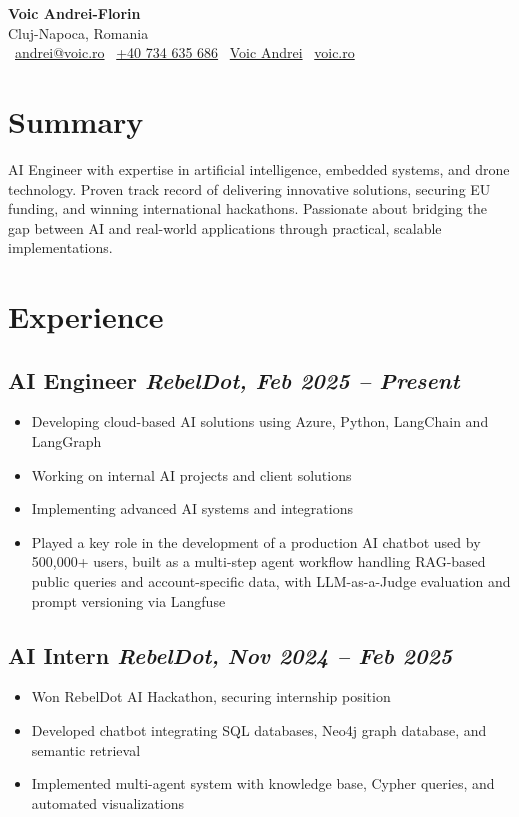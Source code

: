 \documentclass[11pt,a4paper]{article}
\begin{document}
\begin{center}
    {\LARGE \textbf{Voic Andrei-Florin}} \\[0.3em]
    Cluj-Napoca, Romania \\
    \faEnvelope~\href{mailto:andrei@voic.ro}{andrei@voic.ro} \quad
    \faPhone~\href{tel:+40734635686}{+40 734 635 686} \quad
    \faLinkedin~\href{https://linkedin.com/in/voic-andrei-622781212}{Voic Andrei} \quad
    \faGlobe~\href{https://voic.ro}{voic.ro}
\end{center}

\section*{Summary}
AI Engineer with expertise in artificial intelligence, embedded systems, and drone technology. Proven track record of delivering innovative solutions, securing EU funding, and winning international hackathons. Passionate about bridging the gap between AI and real-world applications through practical, scalable implementations.

\section*{Experience}

\subsection*{AI Engineer \hfill \textit{RebelDot, Feb 2025 -- Present}}
\begin{itemize}
    \item Developing cloud-based AI solutions using Azure, Python, LangChain and LangGraph
    \item Working on internal AI projects and client solutions
    \item Implementing advanced AI systems and integrations
    \item Played a key role in the development of a production AI chatbot used by 500,000+ users, built as a multi-step agent workflow handling RAG-based public queries and account-specific data, with LLM-as-a-Judge evaluation and prompt versioning via Langfuse

\end{itemize}

\subsection*{AI Intern \hfill \textit{RebelDot, Nov 2024 -- Feb 2025}}
\begin{itemize}
    \item Won RebelDot AI Hackathon, securing internship position
    \item Developed chatbot integrating SQL databases, Neo4j graph database, and semantic retrieval
    \item Implemented multi-agent system with knowledge base, Cypher queries, and automated visualizations
\end{itemize}
\end{document}
